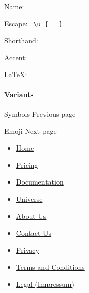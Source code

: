 { }

\subsubsection{\texorpdfstring{{ }}{ }}\label{section}

Name: \texttt{\ }


Escape: \texttt{\ \textbackslash{}u\ \{\ }{\texttt{\ }}\texttt{\ \}\ }


Shorthand: \texttt{\ }

{ }

Accent:


LaTeX: \texttt{\ }

\paragraph{Variants}\label{variants}

{ }

\href{/docs/reference/symbols/}{\pandocbounded{}}

{ Symbols } { Previous page }

\href{/docs/reference/symbols/emoji/}{\pandocbounded{}}

{ Emoji } { Next page }

\begin{itemize}
\tightlist
\item
  \href{/}{Home}
\item
  \href{/pricing/}{Pricing}
\item
  \href{/docs/}{Documentation}
\item
  \href{/universe/}{Universe}
\item
  \href{/about/}{About Us}
\item
  \href{/contact/}{Contact Us}
\item
  \href{/privacy/}{Privacy}
\item
  \href{https://typst.app/terms}{Terms and Conditions}
\item
  \href{/legal/}{Legal (Impressum)}
\end{itemize}

